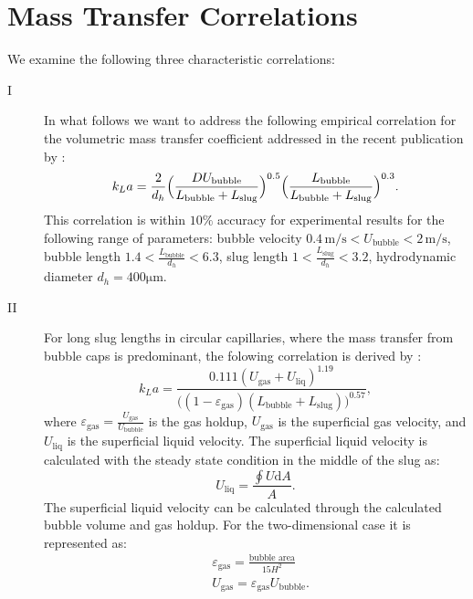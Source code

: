 \documentclass{article}
\begin{document}
\section{Mass Transfer Correlations}
\label{sec:correlations}
We examine the following three characteristic correlations:
\begin{description}
\item[I]
In what follows we want to address the following empirical correlation for the volumetric mass
transfer coefficient addressed in the recent
publication by \citet{yue-mass}:
\begin{equation}
k_L a=\frac{2}{d_h} \Bigl(\frac{D
U_{\mathrm{bubble}}}{L_{\mathrm{bubble}}+L_{\mathrm{slug}}}\Bigr)^{0.5}
\Bigl(\frac{L_{\mathrm{bubble}}}{L_{\mathrm{bubble}}+L_{\mathrm{slug}}}\Bigr)^{0.3}.
\end{equation}
This correlation is within $10\%$ accuracy for experimental results for the following range of
parameters: bubble velocity $0.4\,\mathrm{m/s}<U_{\mathrm{bubble}}<2\,\mathrm{m/s}$, bubble length
$1.4<\frac{L_{\mathrm{bubble}}}{d_h}<6.3$, slug length $1<\frac{L_{\mathrm{slug}}}{d_h}<3.2$,
hydrodynamic diameter $d_h = 400
\mathrm{\mu m}$.

\item[II]
For long slug lengths in circular capillaries, where the mass transfer from bubble caps is
predominant, the folowing correlation is derived by
\citet{bercic-mass}:
\begin{equation}
k_L a = \frac{0.111
(U_{\mathrm{gas}}+U_{\mathrm{liq}})^{1.19}}{\bigl((1-\varepsilon_{\mathrm{gas}})(L_{\mathrm{bubble}}
+L_ {\mathrm{slug}} )\bigr)^{0.57} },
\end{equation}
where $\varepsilon_{\mathrm{gas}}=\frac{U_{\mathrm{gas}}}{U_{\mathrm{bubble}}}$ is the gas holdup,
$U_{\mathrm{gas}}$ is the superficial gas velocity, and $U_{\mathrm{liq}}$ is the superficial
liquid velocity. The superficial liquid velocity is calculated with the steady state condition in
the middle of the slug as:
\begin{equation}
U_{\mathrm{liq}}=\frac{\oint U \mathrm{d}A}{A}.
\end{equation}
The superficial liquid velocity can be calculated through the calculated bubble volume and gas
holdup. For the two-dimensional case it is represented as:
\begin{equation}
\begin{aligned}
&\varepsilon_{\mathrm{gas}}=\frac{\text{bubble area}}{15 H^2}\\
&U_{\mathrm{gas}}=\varepsilon_{\mathrm{gas}} U_{\mathrm{bubble}}.
\end{aligned}
\end{equation}


\end{description}
\end{document}
